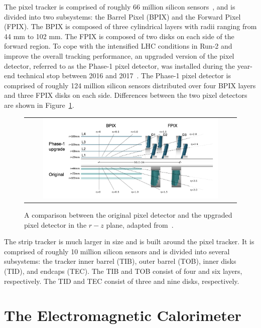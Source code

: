 The pixel tracker is comprised of roughly 66 million silicon sensors~\cite{CMS:2014pgm}, and is divided into two subsystems: the Barrel Pixel (BPIX) and the Forward Pixel (FPIX). The BPIX is composed of three cylindrical layers with radii ranging from 44 mm to 102 mm. The FPIX is composed of two disks on each side of the forward region. To cope with the intensified \ac{LHC} conditions in Run-2 and improve the overall tracking performance, an upgraded version of the pixel detector, referred to as the Phase-1 pixel detector, was installed during the year-end technical stop between 2016 and 2017~\cite{CMSTrackerGroup:2020edz}. The Phase-1 pixel detector is comprised of roughly 124 million silicon sensors distributed over four BPIX layers and three FPIX disks on each side. Differences between the two pixel detectors are shown in Figure~\ref{fig:Pixel}.

\begin{figure}[tbh!]
 \begin{center}
 \begin{tabular}{c}
 \includegraphics[width=0.85\textwidth]{figures/Part2/CMS/Pixel}
 \end{tabular}
 \caption{A comparison between the original pixel detector and the upgraded pixel detector in the $r-z$ plane, adapted from~\cite{CMSTrackerGroup:2020edz}.}
 \label{fig:Pixel}
 \end{center}
\end{figure}

The strip tracker is much larger in size and is built around the pixel tracker. It is comprised of roughly 10 million silicon sensors and is divided into several subsystems: the tracker inner barrel (TIB), outer barrel (TOB), inner disks (TID), and endcaps (TEC). The TIB and TOB consist of four and six layers, respectively. The TID and TEC consist of three and nine disks, respectively.

\section{The Electromagnetic Calorimeter}
\label{sec:ECAL}

